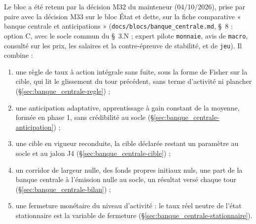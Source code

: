 \documentclass[11pt,a4paper]{article}
\begin{document}
\begin{proposee}
Le bloc a été retenu par la décision M32 du mainteneur (04/10/2026), prise par paire avec la décision M33 sur le bloc État et dette, sur la fiche comparative « banque centrale et anticipations » (\nolinkurl{docs/blocs/banque_centrale.md}, \S~8 : option C, avec le socle commun du \S~3.N ; expert pilote \texttt{monnaie}, avis de \texttt{macro}, consulté sur les prix, les salaires et la contre-épreuve de stabilité, et de \texttt{jeu}). Il combine :
\begin{enumerate}[label=(\alph*)]
\item une règle de taux à action intégrale sans fuite, sous la forme de Fisher sur la cible, qui lit le glissement du tour précédent, sans terme d'activité ni plancher (\S\ref{sec:banque_centrale-regle}) ;
\item une anticipation adaptative, apprentissage à gain constant de la moyenne, formée en phase 1, sans crédibilité au socle (\S\ref{sec:banque_centrale-anticipation}) ;
\item une cible en vigueur reconduite, la cible déclarée restant un paramètre au socle et au jalon J4 (\S\ref{sec:banque_centrale-cible}) ;
\item un corridor de largeur nulle, des fonds propres initiaux nuls, une part de la banque centrale à l'émission nulle au socle, un résultat versé chaque tour (\S\ref{sec:banque_centrale-bilan}) ;
\item une fermeture monétaire du niveau d'activité : le taux réel neutre de l'état stationnaire est la variable de fermeture (\S\ref{sec:banque_centrale-stationnaire}).
\end{enumerate}

\end{proposee}
\end{document}
